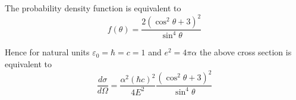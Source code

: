 The probability density function is equivalent to
\begin{equation*}
f(\theta)=\frac{2(\cos^2\theta+3)^2}{\sin^4\theta}
\end{equation*}

Hence for natural units $\varepsilon_0=\hbar=c=1$ and $e^2=4\pi\alpha$ the above cross section is equivalent to
\begin{equation*}
\frac{d\sigma}{d\Omega}=\frac{\alpha^2(\hbar c)^2}{4E^2}
\frac{(\cos^2\theta+3)^2}{\sin^4\theta}
\end{equation*}


